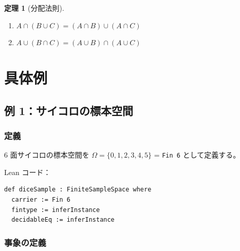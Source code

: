 \documentclass[12pt,a4paper,ja=standard]{bxjsarticle}
\theoremstyle{definition}
\newtheorem{theorem}[definition]{定理}
\begin{document}
\begin{theorem}[分配法則]
\begin{enumerate}
    \item $A \cap (B \cup C) = (A \cap B) \cup (A \cap C)$
    \item $A \cup (B \cap C) = (A \cup B) \cap (A \cup C)$
\end{enumerate}
\end{theorem}

\section{具体例}\label{sec:examples}

\subsection{例 1：サイコロの標本空間}

\subsubsection{定義}

6 面サイコロの標本空間を $\Omega = \{0, 1, 2, 3, 4, 5\}$ = \texttt{Fin 6} として定義する。

Lean コード：
\begin{tcolorbox}[title=サイコロの標本空間（527--530 行目）]
\begin{verbatim}
def diceSample : FiniteSampleSpace where
  carrier := Fin 6
  fintype := inferInstance
  decidableEq := inferInstance
\end{verbatim}
\end{tcolorbox}

\subsubsection{事象の定義}
\end{document}
